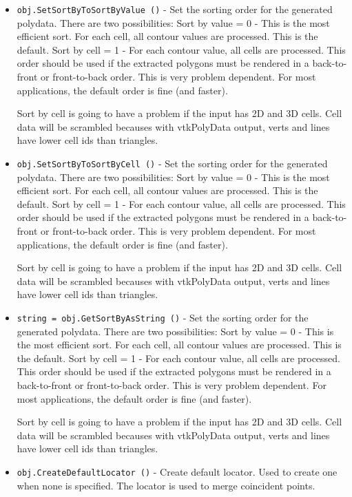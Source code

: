 \begin{itemize}
\item  \verb|obj.SetSortByToSortByValue ()| -  Set the sorting order for the generated polydata. There are two
 possibilities:
   Sort by value = 0 - This is the most efficient sort. For each cell,
      all contour values are processed. This is the default.
   Sort by cell = 1 - For each contour value, all cells are processed.
      This order should be used if the extracted polygons must be rendered
      in a back-to-front or front-to-back order. This is very problem 
      dependent.
 For most applications, the default order is fine (and faster).

 Sort by cell is going to have a problem if the input has 2D and 3D cells.
 Cell data will be scrambled becauses with 
 vtkPolyData output, verts and lines have lower cell ids than triangles.

\item  \verb|obj.SetSortByToSortByCell ()| -  Set the sorting order for the generated polydata. There are two
 possibilities:
   Sort by value = 0 - This is the most efficient sort. For each cell,
      all contour values are processed. This is the default.
   Sort by cell = 1 - For each contour value, all cells are processed.
      This order should be used if the extracted polygons must be rendered
      in a back-to-front or front-to-back order. This is very problem 
      dependent.
 For most applications, the default order is fine (and faster).

 Sort by cell is going to have a problem if the input has 2D and 3D cells.
 Cell data will be scrambled becauses with 
 vtkPolyData output, verts and lines have lower cell ids than triangles.

\item  \verb|string = obj.GetSortByAsString ()| -  Set the sorting order for the generated polydata. There are two
 possibilities:
   Sort by value = 0 - This is the most efficient sort. For each cell,
      all contour values are processed. This is the default.
   Sort by cell = 1 - For each contour value, all cells are processed.
      This order should be used if the extracted polygons must be rendered
      in a back-to-front or front-to-back order. This is very problem 
      dependent.
 For most applications, the default order is fine (and faster).

 Sort by cell is going to have a problem if the input has 2D and 3D cells.
 Cell data will be scrambled becauses with 
 vtkPolyData output, verts and lines have lower cell ids than triangles.

\item  \verb|obj.CreateDefaultLocator ()| -  Create default locator. Used to create one when none is specified. The 
 locator is used to merge coincident points.

\end{itemize}
